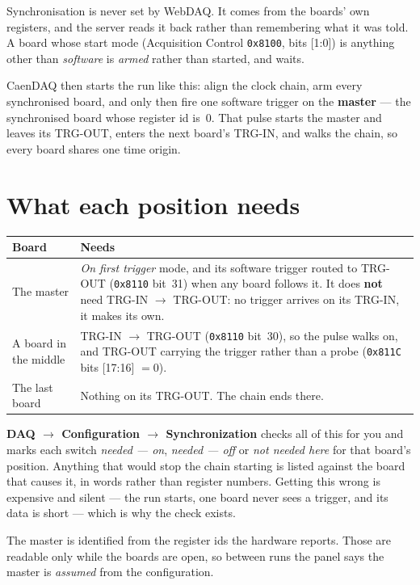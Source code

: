 \documentclass[11pt,a4paper]{report}
\newcommand{\cmd}[1]{\texttt{#1}}
\newcommand{\ui}[1]{\textbf{#1}}          %
\begin{document}
Synchronisation is never set by WebDAQ. It comes from the boards' own registers,
and the server reads it back rather than remembering what it was told. A board
whose start mode (Acquisition Control \cmd{0x8100}, bits [1:0]) is anything other
than \emph{software} is \emph{armed} rather than started, and waits.

CaenDAQ then starts the run like this: align the clock chain, arm every
synchronised board, and only then fire one software trigger on the \textbf{master}
--- the synchronised board whose register id is~0. That pulse starts the master
and leaves its TRG-OUT, enters the next board's TRG-IN, and walks the chain, so
every board shares one time origin.

\section{What each position needs}

\begin{center}
\begin{tabular}{@{}L{0.26\textwidth}L{0.66\textwidth}@{}}
\toprule
\textbf{Board} & \textbf{Needs} \\
\midrule
The master & \emph{On first trigger} mode, and its software trigger routed to
TRG-OUT (\cmd{0x8110} bit~31) when any board follows it. It does \textbf{not} need
TRG-IN $\rightarrow$ TRG-OUT: no trigger arrives on its TRG-IN, it makes its
own. \\
A board in the middle & TRG-IN $\rightarrow$ TRG-OUT (\cmd{0x8110} bit~30), so the
pulse walks on, and TRG-OUT carrying the trigger rather than a probe
(\cmd{0x811C} bits [17:16] $=0$). \\
The last board & Nothing on its TRG-OUT. The chain ends there. \\
\bottomrule
\end{tabular}
\end{center}

\ui{DAQ $\rightarrow$ Configuration $\rightarrow$ Synchronization} checks all of
this for you and marks each switch \emph{needed --- on}, \emph{needed --- off} or
\emph{not needed here} for that board's position. Anything that would stop the
chain starting is listed against the board that causes it, in words rather than
register numbers. Getting this wrong is expensive and silent --- the run starts,
one board never sees a trigger, and its data is short --- which is why the check
exists.

The master is identified from the register ids the hardware reports. Those are
readable only while the boards are open, so between runs the panel says the master
is \emph{assumed} from the configuration.
\end{document}

